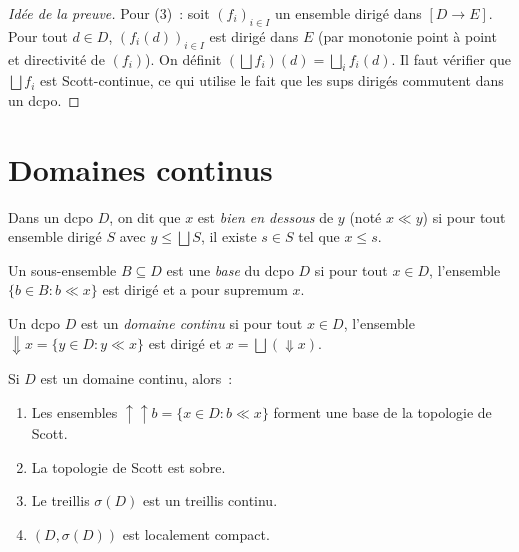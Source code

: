 \begin{proof}[Id\'ee de la preuve]
Pour (3)~: soit $(f_i)_{i\in I}$ un ensemble dirig\'e dans $[D \to E]$. Pour tout $d \in D$,
$(f_i(d))_{i\in I}$ est dirig\'e dans $E$ (par monotonie point \`a point et directivit\'e de
$(f_i)$). On d\'efinit $(\bigsqcup f_i)(d) = \bigsqcup_i f_i(d)$. Il faut v\'erifier que
$\bigsqcup f_i$ est Scott-continue, ce qui utilise le fait que les sups dirig\'es commutent
dans un dcpo.
\end{proof}

\section{Domaines continus}

\begin{definition}
Dans un dcpo $D$, on dit que $x$ est \emph{bien en dessous} de $y$ (not\'e $x \ll y$) si
pour tout ensemble dirig\'e $S$ avec $y \leq \bigsqcup S$, il existe $s \in S$ tel que
$x \leq s$.
\end{definition}

\begin{definition}
Un sous-ensemble $B \subseteq D$ est une \emph{base} du dcpo $D$ si pour tout $x \in D$,
l'ensemble $\{b \in B : b \ll x\}$ est dirig\'e et a pour supremum $x$.
\end{definition}

\begin{definition}
Un dcpo $D$ est un \emph{domaine continu} si pour tout $x \in D$, l'ensemble
$\Downarrow\! x = \{y \in D : y \ll x\}$ est dirig\'e et $x = \bigsqcup(\Downarrow\! x)$.
\end{definition}

\begin{theoreme}
Si $D$ est un domaine continu, alors~:
\begin{enumerate}
  \item Les ensembles $\uparrow\!\! \uparrow b = \{x \in D : b \ll x\}$ forment une
    base de la topologie de Scott.
  \item La topologie de Scott est sobre.
  \item Le treillis $\sigma(D)$ est un treillis continu.
  \item $(D,\sigma(D))$ est localement compact.
\end{enumerate}
\end{theoreme}


